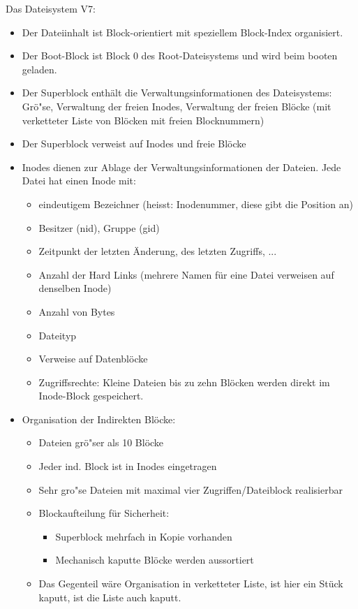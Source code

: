 \begin{answer}
  Das Dateisystem V7: 
  \begin{itemize}
  \item Der Dateiinhalt ist Block-orientiert mit speziellem Block-Index organisiert. 
  \item Der Boot-Block ist Block 0 des Root-Dateisystems und wird beim booten geladen. 
  \item Der Superblock enthält die Verwaltungsinformationen des Dateisystems: Grö"se, Verwaltung der freien Inodes, Verwaltung der freien Blöcke (mit verketteter Liste von Blöcken mit freien Blocknummern) 
  \item Der Superblock verweist auf Inodes und freie Blöcke
  \item Inodes dienen zur Ablage der Verwaltungsinformationen der Dateien. Jede Datei hat einen Inode mit:
    \begin{itemize}
    \item eindeutigem Bezeichner (heisst: Inodenummer, diese gibt die Position an) 
    \item Besitzer (nid), Gruppe (gid) 
    \item Zeitpunkt der letzten Änderung, des letzten Zugriffs, ... 
    \item Anzahl der Hard Links (mehrere Namen für eine Datei verweisen auf denselben Inode) 
    \item Anzahl von Bytes 
    \item Dateityp 
    \item Verweise auf Datenblöcke 
    \item Zugriffsrechte: Kleine Dateien bis zu zehn Blöcken werden direkt im Inode-Block gespeichert.
    \end{itemize}

  \item Organisation der Indirekten Blöcke:
  \begin{itemize}
  \item Dateien grö"ser als 10 Blöcke
  \item Jeder ind. Block ist in Inodes eingetragen
  \item Sehr gro"se Dateien mit maximal vier Zugriffen/Dateiblock realisierbar
  \item Blockaufteilung für Sicherheit: 
  \begin{itemize}
  \item Superblock mehrfach in Kopie vorhanden
  \item Mechanisch kaputte Blöcke werden aussortiert
  \end{itemize}
  \item Das Gegenteil wäre Organisation in verketteter Liste, ist hier ein Stück kaputt, ist die Liste auch kaputt.
  \end{itemize}
  \end{itemize}
\end{answer}

